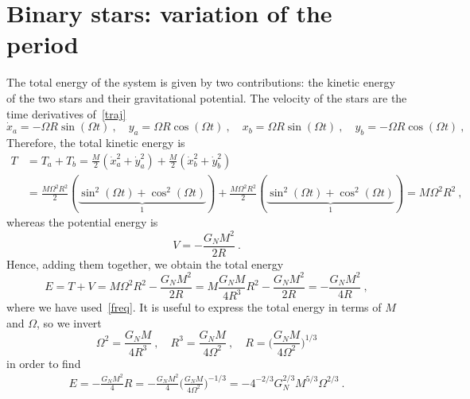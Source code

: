 \documentclass[a4paper]{article}
\begin{document}
\section{Binary stars: variation of the period}

    The total energy of the system is given by two contributions: the kinetic energy of the two stars and their gravitational potential. The velocity of the stars are the time derivatives of~\eqref{traj}
    \begin{equation*}
        \dot x_a = - \Omega R \sin (\Omega t) ~, \quad y_a = \Omega R \cos (\Omega t) ~, \quad x_b = \Omega R \sin (\Omega t) ~, \quad y_b = - \Omega R \cos (\Omega t) ~,
    \end{equation*}
    Therefore, the total kinetic energy is
    \begin{equation*}
    \begin{aligned}
        T & = T_a + T_b = \frac{M}{2} (\dot x_a^2 + \dot y_a^2) + \frac{M}{2} (\dot x_b^2 + \dot y_b^2) \\ & = \frac{M \Omega^2 R^2}{2} (\underbrace{\sin^2 (\Omega t) + \cos^2(\Omega t)}_1) + \frac{M \Omega^2 R^2}{2} (\underbrace{\sin^2 (\Omega t) + \cos^2(\Omega t)}_1) = M \Omega^2 R^2 ~,
    \end{aligned}
    \end{equation*}
    whereas the potential energy is 
    \begin{equation*}
        V = - \frac{G_N M^2}{2 R} ~. 
    \end{equation*}
    Hence, adding them together, we obtain the total energy
    \begin{equation}\label{ener}
        E = T + V =  M \Omega^2 R^2 - \frac{G_N M^2}{2 R} = M \frac{G_N M}{4 R^3} R^2 - \frac{G_N M^2}{2 R} = - \frac{G_N M^2}{4 R} ~,
    \end{equation}
    where we have used~\eqref{freq}. It is useful to express the total energy in terms of $M$ and $\Omega$, so we invert
    \begin{equation*}
        \Omega^2 = \frac{G_N M}{4 R^3} ~, \quad R^3 = \frac{G_N M}{4 \Omega^2} ~, \quad R = \Big ( \frac{G_N M}{4 \Omega^2} \Big)^{1/3}
    \end{equation*}
    in order to find
    \begin{equation*}
    \begin{aligned}
        E = - \frac{G_N M^2}{4} R = - \frac{G_N M^2}{4} \Big ( \frac{G_N M}{4 \Omega^2} \Big)^{- 1/3} = - 4^{-2/3} G_N^{2/3} M^{5/3} \Omega^{2/3} ~.
    \end{aligned}
    \end{equation*}
\end{document}
